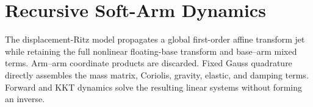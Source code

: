 \documentclass{article}
\begin{document}
\section*{Recursive Soft-Arm Dynamics}
The displacement-Ritz model propagates a global first-order affine transform jet while retaining the full nonlinear floating-base transform and base--arm mixed terms. Arm--arm coordinate products are discarded. Fixed Gauss quadrature directly assembles the mass matrix, Coriolis, gravity, elastic, and damping terms. Forward and KKT dynamics solve the resulting linear systems without forming an inverse.
\end{document}
